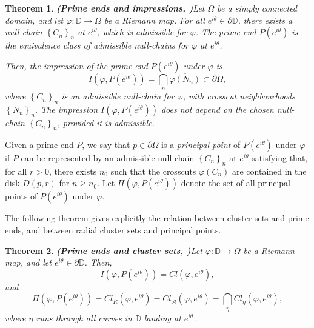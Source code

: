 \documentclass[11pt,a4paper,reqno]{amsart}
\theoremstyle{plain}
\newtheorem{thm}{Theorem}[section]
\theoremstyle{definition}
\theoremstyle{plain}
\begin{document}
\begin{thm}{\bf (Prime ends and impressions, {\normalfont \cite[Thm. 2.15]{Pom92}})}\label{thm-prime-ends-sc}
	Let $ \Omega $ be a simply connected domain, and let $ \varphi\colon\mathbb{D}\to\Omega $ be a Riemann map. For all $ e^{i\theta}\in\partial\mathbb{D} $, there exists a null-chain $ \left\lbrace C_n\right\rbrace _n $ at $ e^{i\theta} $, which is admissible for $ \varphi $.
	The {\em prime end} $ P(e^{i\theta}) $  is the equivalence class of admissible null-chains for $ \varphi $ at $ e^{i\theta} $.
	
\noindent 	 Then, the {\em impression} of the prime end $ P(e^{i\theta}) $ under $ \varphi $ is \[I(\varphi, P( e^{i\theta}))=\bigcap_{n}\overline{\varphi (N_n)}\subset \partial \Omega,\] where $ \left\lbrace C_n\right\rbrace _n $ is an admissible null-chain for $ \varphi $, with crosscut neighbourhoods $ \left\lbrace N_n\right\rbrace _n $. The impression $ I(\varphi, P( e^{i\theta})) $ does not depend on the chosen null-chain $ \left\lbrace C_n\right\rbrace _n $, provided it is admissible.
\end{thm}

Given a prime end $ P $, we say that $ p\in{\partial }\Omega $ is a \textit{principal point} of $ P(e^{i\theta}) $ under $ \varphi $ if $ P $ can be
represented by an admissible  null-chain $ \left\lbrace C_n\right\rbrace _n $ at $ e^{i\theta} $ satisfying that, for all $ r>0 $, there exists $ n_0 $ such that the crosscuts
$ \varphi(C_n)$ are contained in the disk $ D(p, r) $ for $ n\geq n_0 $.
Let $ \varPi(\varphi,P( e^{i\theta}))$ denote the set of all principal points of $ P(e^{i\theta}) $ under $ \varphi $.

The following theorem gives explicitly the relation between cluster sets and prime ends, and between radial cluster sets and principal points.

\begin{thm}{\bf (Prime ends and cluster sets, \bf )}\label{thm-prime-ends}
	Let $ \varphi\colon\mathbb{D}\to \Omega $ be a Riemann map, and let $ e^{i\theta}\in \partial\mathbb{D} $. Then,
	\[ I(\varphi, P( e^{i\theta}))=Cl(\varphi, e^{i\theta}),\]
and  \[\varPi(\varphi,P( e^{i\theta}))=Cl_R(\varphi, e^{i\theta})=Cl_\mathcal{A}(\varphi, e^{i\theta})=\bigcap_{\eta }Cl_\eta(\varphi, e^{i\theta}),\] where $ \eta $ runs through all curves in $ \mathbb{D} $ landing at $ e^{i\theta} $.
\end{thm}
\end{document}
